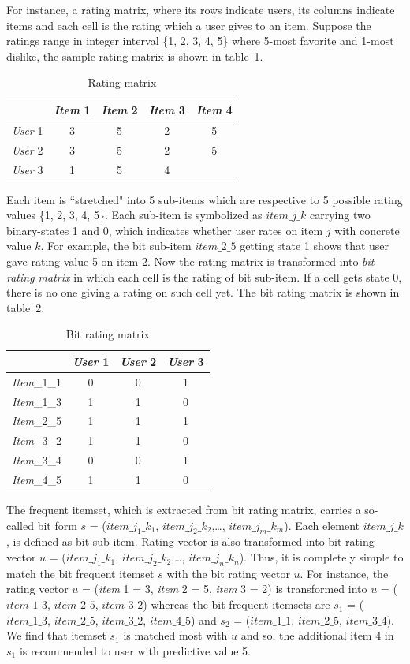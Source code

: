 \documentclass{article}
\begin{document}
For instance, a rating matrix, where its rows indicate users, its columns indicate items and each cell is the rating which a user gives to an item. Suppose the ratings range in integer interval \{1, 2, 3, 4, 5\} where 5-most favorite and 1-most dislike, the sample rating matrix is shown in table~1.
\begin{table} \label{table:rating.matrix}
\centering
\caption{Rating matrix}
\begin{tabular}{|l|c|c|c|c|} \hline
&\textit{Item} 1&\textit{Item} 2&\textit{Item} 3&\textit{Item} 4\\ \hline
\textit{User} 1&3&5&2&5\\ \hline
\textit{User} 2&3&5&2&5\\ \hline
\textit{User} 3&1&5&4&\\ \hline
\end{tabular}
\end{table}
Each item is ``stretched" into 5 sub-items which are respective to 5 possible rating values \{1, 2, 3, 4, 5\}. Each sub-item is symbolized as $item\_j\_k$ carrying two binary-states 1 and 0, which indicates whether user rates on item $j$ with concrete value $k$. For example, the bit sub-item $item\_2\_5$ getting state 1 shows that user gave rating value 5 on item 2. Now the rating matrix is transformed into \textit{bit rating matrix} in which each cell is the rating of bit sub-item. If a cell gets state 0, there is no one giving a rating on such cell yet. The bit rating matrix is shown in table~2.
\begin{table} \label{table:bit.rating.matrix}
\centering
\caption{Bit rating matrix}
\begin{tabular}{|l|c|c|c|} \hline
&\textit{User} 1&\textit{User} 2&\textit{User} 3\\ \hline
\textit{Item}\_1\_1&0&0&1\\ \hline
\textit{Item}\_1\_3&1&1&0\\ \hline
\textit{Item}\_2\_5&1&1&1\\ \hline
\textit{Item}\_3\_2&1&1&0\\ \hline
\textit{Item}\_3\_4&0&0&1\\ \hline
\textit{Item}\_4\_5&1&1&0\\ \hline
\end{tabular}
\end{table}

The frequent itemset, which is extracted from bit rating matrix, carries a so-called bit form $s$ = ($item\_j_1\_k_1$, $item\_j_2\_k_2$,\ldots, $item\_j_m\_k_m$). Each element $item\_j\_k$, is defined as bit sub-item. Rating vector is also transformed into bit rating vector $u$ = ($item\_j_1\_k_1$, $item\_j_2\_k_2$,\ldots, $item\_j_n\_k_n$). Thus, it is completely simple to match the bit frequent itemset $s$ with the bit rating vector $u$. For instance, the rating vector $u$ = (\textit{item} 1 = 3, \textit{item} 2 = 5, \textit{item} 3 = 2) is transformed into $u$ = ($item\_1\_3$, $item\_2\_5$, $item\_3\_2$) whereas the bit frequent itemsets are $s_1$ = ($item\_1\_3$, $item\_2\_5$, $item\_3\_2$, $item\_4\_5$) and $s_2$ = ($item\_1\_1$, $item\_2\_5$, $item\_3\_4$). We find that itemset $s_1$ is matched most with $u$ and so, the additional item 4 in $s_1$ is recommended to user with predictive value 5.
\end{document}
